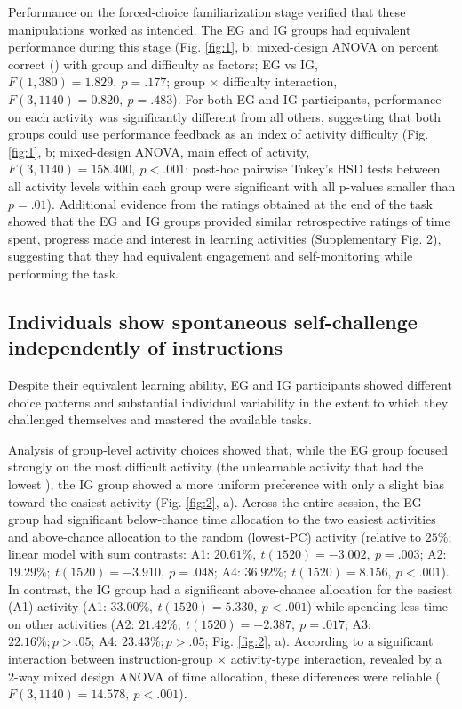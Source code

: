    Performance on the forced-choice familiarization stage verified that these manipulations worked as intended. The EG and IG groups had equivalent  performance during this stage (Fig. \ref{fig:1}, b; mixed-design ANOVA on percent correct ({\PC}) with group and difficulty as factors; EG vs IG, $F(1, 380) = 1.829,\ p = .177$; group $\times$ difficulty interaction, $F(3,1140) = 0.820,\ p = .483$). For both EG and IG participants, performance on each activity was significantly different from all others, suggesting that both groups could use performance feedback as an index of activity difficulty (Fig. \ref{fig:1}, b; mixed-design ANOVA, main effect of activity, $F(3,1140) = 158.400,\ p < .001$; post-hoc pairwise Tukey's HSD tests between all activity levels within each group were significant with  all p-values smaller than $p = .01$). Additional evidence from the ratings obtained at the end of the task showed that the EG and IG groups provided similar retrospective ratings of time spent, progress made and interest in learning activities (Supplementary Fig. 2), suggesting that they had equivalent engagement and self-monitoring while performing the task.
    
    \subsection{Individuals show spontaneous self-challenge independently of instructions} \label{subsec:results/sc}
    
    Despite their equivalent learning ability, EG and IG participants showed different choice patterns and substantial individual variability in the extent to which they challenged themselves and mastered the available tasks. 

    Analysis of group-level activity choices showed that, while the EG group focused strongly on the most difficult activity (the unlearnable activity that had the lowest {\PC}), the IG group showed a more uniform preference with only a slight bias toward the easiest activity (Fig. \ref{fig:2}, a). Across the entire session, the EG group had significant below-chance time allocation to the two easiest activities and above-chance allocation to the random (lowest-PC) activity (relative to $25\%$; linear model with sum contrasts: A1: $20.61\%,\ t(1520) = -3.002,\ p = .003$; A2: $19.29\%;\ t(1520) = -3.910,\ p = .048$; A4: $36.92\%;\ t(1520) = 8.156,\ p < .001$). In contrast, the IG group had a significant above-chance allocation for the easiest (A1) activity (A1: $33.00\%,\ t(1520) = 5.330,\ p < .001$) while spending less time on other activities (A2: $21.42\%;\ t(1520) = -2.387,\ p = .017$; A3: $22.16\%; p > .05$; A4: $23.43\%; p > .05$; Fig. \ref{fig:2}, a). According to a significant interaction between instruction-group $\times$ activity-type interaction, revealed by a 2-way mixed design ANOVA of time allocation, these differences were reliable ($F(3, 1140) = 14.578,\ p < .001$).
    
